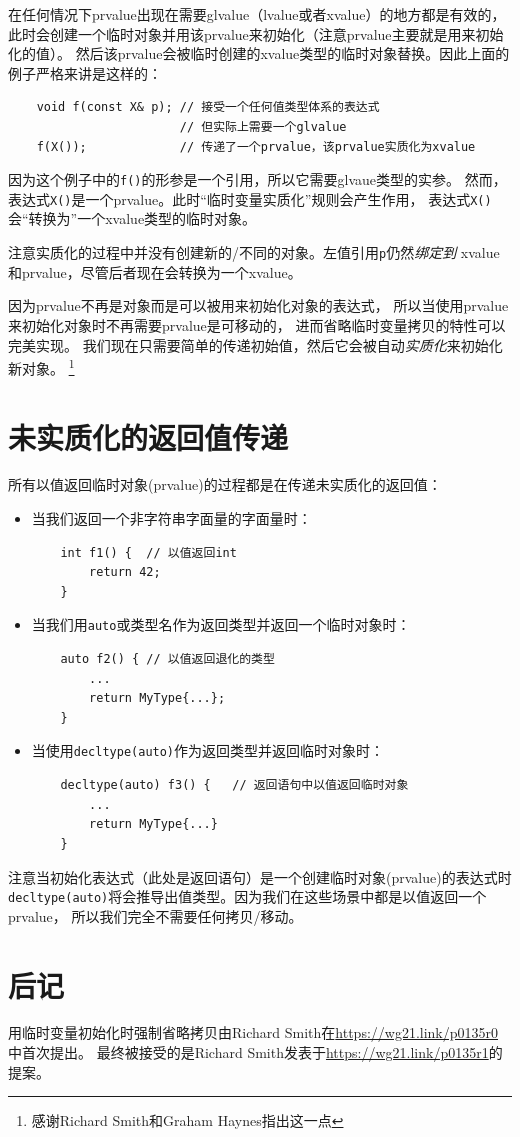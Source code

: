 在任何情况下prvalue出现在需要glvalue（lvalue或者xvalue）的地方都是有效的，
此时会创建一个临时对象并用该prvalue来初始化（注意prvalue主要就是用来初始化的值）。
然后该prvalue会被临时创建的xvalue类型的临时对象替换。因此上面的例子严格来讲是这样的：
\begin{lstlisting}
    void f(const X& p); // 接受一个任何值类型体系的表达式
                        // 但实际上需要一个glvalue
    f(X());             // 传递了一个prvalue，该prvalue实质化为xvalue
\end{lstlisting}
因为这个例子中的\texttt{f()}的形参是一个引用，所以它需要glvaue类型的实参。
然而，表达式\texttt{X()}是一个prvalue。此时“临时变量实质化”规则会产生作用，
表达式\texttt{X()}会“转换为”一个xvalue类型的临时对象。

注意实质化的过程中并没有创建新的/不同的对象。左值引用\texttt{p}仍然\emph{绑定到}
xvalue和prvalue，尽管后者现在会转换为一个xvalue。

因为prvalue不再是对象而是可以被用来初始化对象的表达式，
所以当使用prvalue来初始化对象时不再需要prvalue是可移动的，
进而省略临时变量拷贝的特性可以完美实现。
我们现在只需要简单的传递初始值，然后它会被自动\emph{实质化}来初始化新对象。
\footnote{感谢Richard Smith和Graham Haynes指出这一点}


\section{未实质化的返回值传递}
所有以值返回临时对象(prvalue)的过程都是在传递未实质化的返回值：
\begin{itemize}
    \item 当我们返回一个非字符串字面量的字面量时：
    \begin{lstlisting}
    int f1() {  // 以值返回int
        return 42;
    }
    \end{lstlisting}
    \item 当我们用\texttt{auto}或类型名作为返回类型并返回一个临时对象时：
    \begin{lstlisting}
    auto f2() { // 以值返回退化的类型
        ...
        return MyType{...};
    }
    \end{lstlisting}
    \item 当使用\texttt{decltype(auto)}作为返回类型并返回临时对象时：
    \begin{lstlisting}
    decltype(auto) f3() {   // 返回语句中以值返回临时对象
        ...
        return MyType{...}
    }
    \end{lstlisting}
\end{itemize}

注意当初始化表达式（此处是返回语句）是一个创建临时对象(prvalue)的表达式时
\texttt{decltype(auto)}将会推导出值类型。因为我们在这些场景中都是以值返回一个prvalue，
所以我们完全不需要任何拷贝/移动。


\section{后记}
用临时变量初始化时强制省略拷贝由Richard Smith在\url{https://wg21.link/p0135r0}中首次提出。
最终被接受的是Richard Smith发表于\url{https://wg21.link/p0135r1}的提案。